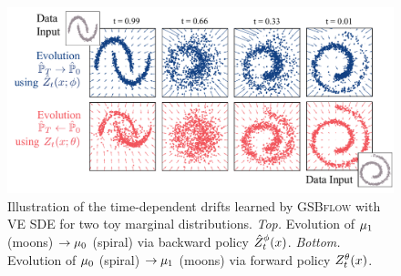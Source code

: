 \begin{figure}[t]
     \centering
         \centering
         \includegraphics[width=0.8\linewidth]{figures/fig_pred_gsbve_toy_spiral_moon.pdf}
         \caption{Illustration of the time-dependent drifts learned by \textsc{GSBflow} with VE SDE for two toy marginal distributions. \emph{Top.} Evolution of $\mu_1$ (moons) $\rightarrow \mu_0$ (spiral) via backward policy {\color{blue} $\SBb$}. \emph{Bottom.} Evolution of $\mu_0$ (spiral) $\rightarrow \mu_1$ (moons) via forward policy {\color{pink} $\SBf$}.}
        \label{fig:res_synthetic}
\end{figure}

\begin{table}[t]
    \caption{Evaluation of predictive performance w.r.t. the entropy-regularized Wasserstein distance $W_\varepsilon$ \citep{cuturi2013sinkhorn} of \textsc{GSBflow} and baselines on generating different single-cell datasets (using 3 runs).}
    \label{tab:exp_wasserstein_cells}
    \centering
{}
\end{table}

